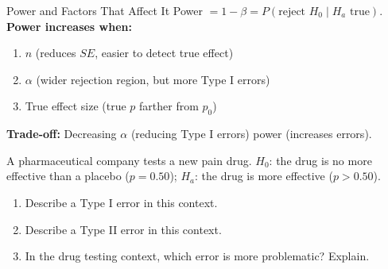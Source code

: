 \documentclass[10pt]{article}
\begin{document}
\begin{notesbox}{Power and Factors That Affect It}
Power $= 1 - \beta = P(\text{reject } H_0 \mid H_a \text{ true})$.\\[4pt]
\textbf{Power increases when:}
\begin{enumerate}[leftmargin=1.5em]
  \item $n$ \blank{3cm} (reduces $SE$, easier to detect true effect)
  \item $\alpha$ \blank{3cm} (wider rejection region, but more Type I errors)
  \item True effect size \blank{3cm} (true $p$ farther from $p_0$)
\end{enumerate}

\vspace{4pt}
\textbf{Trade-off:} Decreasing $\alpha$ (reducing Type I errors) \blank{3cm} power (increases \blank{2cm} errors).
\end{notesbox}

\begin{practicebox}
A pharmaceutical company tests a new pain drug. $H_0$: the drug is no more effective than a
placebo ($p = 0.50$); $H_a$: the drug is more effective ($p > 0.50$).

\begin{enumerate}[label=\alph*.]
  \item Describe a Type I error in this context. 
  \item Describe a Type II error in this context. 
  \item In the drug testing context, which error is more problematic? Explain. 
\end{enumerate}
\end{practicebox}
\end{document}
